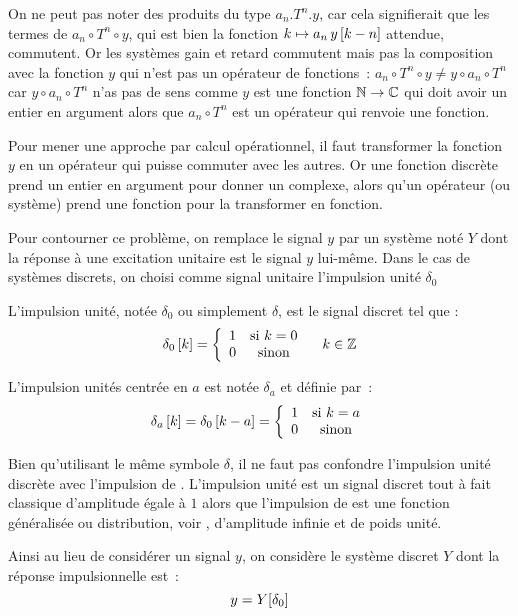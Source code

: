 \begin{remarque}
  On ne peut pas noter des produits du type $a_n.T^n.y$, car cela
  signifierait que les termes de $a_n\circ T^n\circ y$, qui est bien
  la fonction $k\mapsto a_n\,y\left[k-n\right]$ attendue, commutent. Or les
  systèmes gain et retard commutent mais pas la composition avec la
  fonction $y$ qui n'est pas un opérateur de fonctions~:
  $a_n\circ T^n\circ y \neq y\circ a_n\circ T^n$ car
  $y\circ a_n\circ T^n$ n'as pas de sens comme $y$ est une fonction
  $\mathbb{N}\rightarrow \mathbb{C}$ qui doit avoir un entier en argument alors que
  $a_n\circ T^n$ est un opérateur qui renvoie une fonction.
\end{remarque}



Pour mener une approche par calcul opérationnel, il faut transformer
la fonction $y$ en un opérateur qui puisse commuter avec les autres.
Or une fonction discrète prend un entier en argument pour donner un
complexe, alors qu'un opérateur (ou système) prend une fonction pour
la transformer en fonction.

Pour contourner ce problème, on remplace le signal $y$ par un système
noté $Y$ dont la réponse à une excitation unitaire est le signal
$y$ lui-même. Dans le cas de systèmes discrets, on choisi comme signal unitaire l'impulsion unité $\delta_{0}$

\begin{definition}
  \label{def:impulsion_unite}
  L'impulsion unité, notée $\delta_0$ ou simplement $\delta$, est le signal discret tel que :
  $$
  \delta_0\left[k\right]=\left\{\begin{array}{cc} {1} & {\text{si } k=0}\\ {0} & {\text{sinon}}\\ \end{array}\right. \quad k\in\mathbb{Z}
  $$

  L'impulsion unités centrée en $a$ est notée $\delta_a$ et définie par~:
  $$
  \delta_a\left[k\right]=\delta_0\left[k-a\right] = \left\{\begin{array}{cc} {1} & {\text{si } k=a}\\ {0} & {\text{sinon}}\\ \end{array}\right.
  $$

  Bien qu'utilisant le même symbole $\delta$, il ne faut pas confondre
  l'impulsion unité discrète avec l'impulsion de \Dirac. L'impulsion
  unité est un signal discret tout à fait classique d'amplitude égale
  à $1$ alors que l'impulsion de \Dirac{} est une fonction généralisée
  ou distribution, voir , d'amplitude infinie et de
  poids unité.
\end{definition}

Ainsi au lieu de considérer un signal $y$, on considère le système discret $Y$ dont la réponse impulsionnelle est~:
\begin{equation}
  y = Y\!\left[\delta_0\right]
\end{equation}




